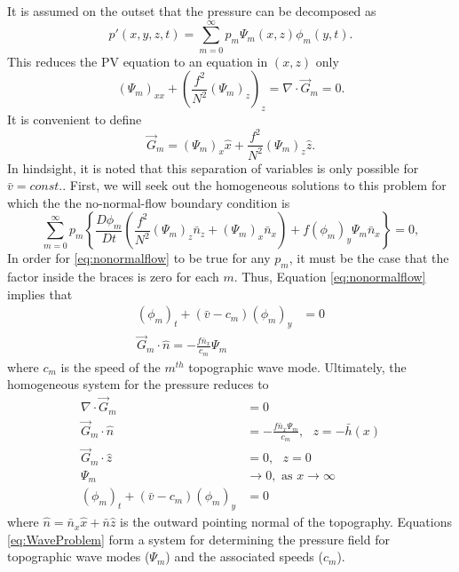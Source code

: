 \documentclass[12pt]{workjournal}
\begin{document}
It is assumed on the outset that the pressure can be decomposed as
\begin{equation}
p'(x,y,z,t) = \sum_{m=0}^{\infty} p_m \Psi_m(x,z) \phi_m(y,t).
\end{equation}
This reduces the PV equation to an equation in $(x,z)$ only
\begin{equation}
(\Psi_m)_{xx} + \left( \frac{f^2}{N^2} (\Psi_m)_z\right)_z = \nabla \cdot \vec{G}_m = 0. \label{eq:eqforpressure}
\end{equation}
It is convenient to define 
\begin{equation}
\vec{G}_m = (\Psi_m)_x \hat{x} + \frac{f^2}{N^2}(\Psi_m)_z \hat{z}.
\end{equation}
In hindsight, it is noted that this separation of variables is only possible for $\bar{v} = const.$. First, we will seek out the homogeneous solutions to this problem for which the the no-normal-flow boundary condition is
\begin{equation}
\sum_{m=0}^{\infty} p_m \left\lbrace \frac{D\phi_m}{Dt} \left( \frac{f^2}{N^2}(\Psi_m)_z\bar{n}_z  + (\Psi_m)_x \bar{n}_x \right) + f (\phi_m)_y \Psi_m\bar{n}_x \right\rbrace = 0, \label{eq:nonormalflow}
\end{equation}
In order for \eqref{eq:nonormalflow} to be true for any $p_m$, it must be the case that the factor inside the braces is zero for each $m$. Thus, Equation \eqref{eq:nonormalflow} implies that
\begin{subequations}
\begin{align}
(\phi_m)_t + (\bar{v} - c_m)(\phi_m)_y &= 0 \\
\vec{G}_m \cdot \hat{n} = -\frac{f\bar{n}_x}{c_m} \Psi_m
\end{align}
\end{subequations}
where $c_m$ is the speed of the $m^{th}$ topographic wave mode. Ultimately, the homogeneous system for the pressure reduces to
\begin{subequations}
\begin{align}
\nabla \cdot \vec{G}_m &= 0 \\
\vec{G}_m \cdot \hat{n} &= -\frac{ f\bar{n}_x \Psi_m }{c_m}, \text{ $z = -\bar{h}(x)$}\\
\vec{G}_m \cdot \hat{z} &= 0, \text{ $z = 0$ } \\
\Psi_m &\rightarrow 0, \text{ as $x\rightarrow \infty$} \\
(\phi_m)_t + (\bar{v} - c_m) (\phi_m)_y &= 0
\end{align}\label{eq:WaveProblem}
\end{subequations}
where $\hat{n} =  \bar{n}_x \hat{x} + \bar{n} \hat{z}$ is the outward pointing normal of the topography. Equations \eqref{eq:WaveProblem} form a system for determining the pressure field for topographic wave modes ($\Psi_m$) and the associated speeds ($c_m$).
\end{document}
